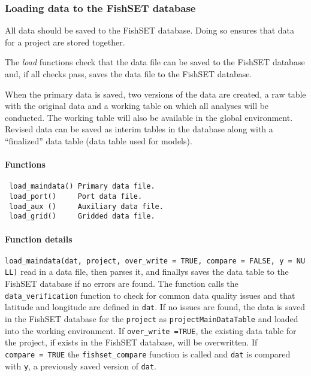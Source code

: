 \documentclass[
]{article}
\begin{document}
\hypertarget{loading-data-to-the-fishset-database}{%
\subsubsection{Loading data to the FishSET database}\label{loading-data-to-the-fishset-database}}

All data should be saved to the FishSET database. Doing so ensures that data for a project are stored together.

The \emph{load} functions check that the data file can be saved to the FishSET database and, if all checks pass, saves the data file to the FishSET database.

When the primary data is saved, two versions of the data are created, a raw table with the original data and a working table on which all analyses will be conducted. The working table will also be available in the global environment. Revised data can be saved as interim tables in the database along with a ``finalized'' data table (data table used for models).

\hypertarget{functions}{%
\paragraph{Functions}\label{functions}}

\begin{verbatim}
 load_maindata() Primary data file. 
 load_port()     Port data file. 
 load_aux ()     Auxiliary data file. 
 load_grid()     Gridded data file.
\end{verbatim}

\hypertarget{function-details}{%
\paragraph{Function details}\label{function-details}}

\texttt{load\_maindata(dat,\ project,\ over\_write\ =\ TRUE,\ compare\ =\ FALSE,\ y\ =\ NULL)} read in a data file, then parses it, and finallys saves the data table to the FishSET database if no errors are found. The function calls the \texttt{data\_verification} function to check for common data quality issues and that latitude and longitude are defined in \texttt{dat}. If no issues are found, the data is saved in the FishSET database for the \texttt{project} as \texttt{projectMainDataTable} and loaded into the working environment. If \texttt{over\_write\ =TRUE}, the existing data table for the project, if exists in the FishSET database, will be overwritten. If \texttt{compare\ =\ TRUE} the \texttt{fishset\_compare} function is called and \texttt{dat} is compared with \texttt{y}, a previously saved version of \texttt{dat}.
\end{document}

